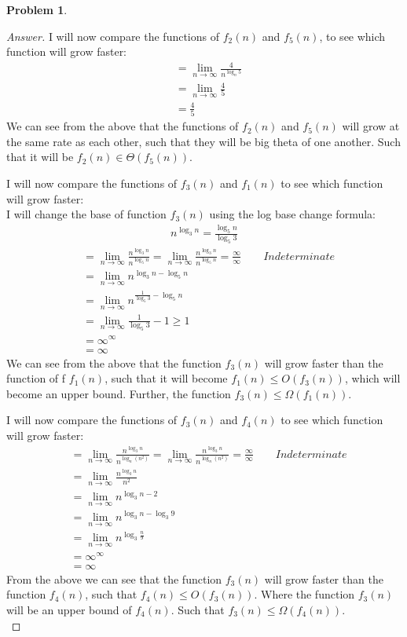 \documentclass[11pt]{article}
\theoremstyle{definition}
\theoremstyle{definition}
\newtheorem{required}{Problem}
\theoremstyle{definition}
\begin{document}
\begin{required}
\begin{enumerate}[label=(\alph*)]
\begin{proof}[Answer]
I will now compare the functions of $f_2(n)$ and $f_5(n)$, to see which function will grow faster: \\
\begin{align*}
&= \lim_{n \to \infty} \frac{4}{n^{\log_n 5}} \\
&= \lim_{n \to \infty} \frac{4}{5} \\
&= \frac {4}{5}
\end{align*} 
We can see from the above that the functions of $f_2(n)$ and $f_5(n)$ will grow at the same rate as each other, such that they will be big theta of one another. Such that it will be $f_2(n) \in \Theta(f_5(n))$.

I will now compare the functions of $f_3(n)$ and $f_1(n)$ to see which function will grow faster: \\
I will change the base of function $f_3(n)$ using the log base change formula:
\begin{align*}
n^{\log_3 n} = \frac{\log_5 n}{\log_5 3}
\end{align*}
\begin{align*}
&= \lim_{n \to \infty} \frac{n^{\log_3 n}}{n^{\log_5 n}} = \lim_{n \to \infty} \frac{n^{\log_3 n}}{n^{\log_5 n}}  = \frac{\infty}{\infty} \qquad Indeterminate  \\
&= \lim_{n \to \infty} n^{{\log_3 n}-{\log_5 n}} \\
&= \lim_{n \to \infty} n^{{\frac{1}{\log_5 3}}-{\log_5 n}} \\
&= \lim_{n \to \infty} \frac{1}{\log_5 3} - 1 \ge 1 \\
&= \infty^{\infty} \\
&= \infty
\end{align*} 
We can see from the above that the function $f_3(n)$ will grow faster than the function of f $f_1(n)$, such that it will become $f_1(n) \leq O(f_3(n))$, which will become an upper bound. Further, the function $f_3(n) \leq \Omega(f_1(n))$.

I will now compare the functions of $f_3(n)$ and $f_4(n)$ to see which function will grow faster: \\
\begin{align*}
&= \lim_{n \to \infty} \frac{n^{\log_3 n}}{n^{\log_n(n^2)}} = \lim_{n \to \infty} \frac{n^{\log_3 n}}{n^{\log_n(n^2)}}  = \frac{\infty}{\infty} \qquad Indeterminate  \\
&= \lim_{n \to \infty} \frac{n^{\log_3 n}}{n^2} \\
&= \lim_{n \to \infty} n^{{\log_3 n}-{2}} \\
&= \lim_{n \to \infty} n^{{\log_3 n}-{\log_3 9}} \\
&= \lim_{n \to \infty} n^{\log_3 \frac{n}{9}}\\
&= \infty^{\infty}\\
&= \infty
\end{align*} 
From the above we can see that the function $f_3(n)$ will grow faster than the function $f_4(n)$, such that $f_4(n) \leq O(f_3(n))$. Where the function $f_3(n)$ will be an upper bound of $f_4(n)$. Such that $f_3(n) \leq \Omega(f_4(n))$.\\


\end{proof}
\end{enumerate}
\end{required}
\end{document}
